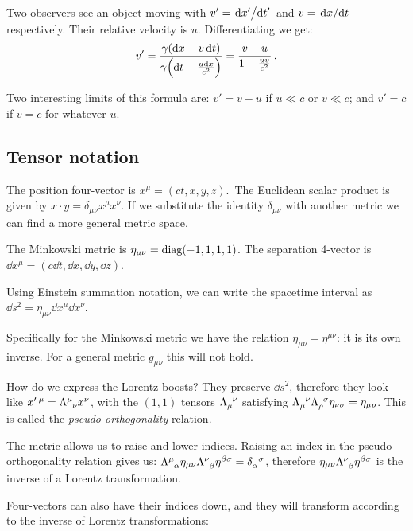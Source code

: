 \documentclass[main.tex]{subfiles}
\begin{document}
Two observers see an object moving with \(v' = \dv*{x'}{t'}\) and  \(v = \dv*{x}{t}\) respectively. Their relative velocity is \(u\).
Differentiating we get:
%
\begin{equation}
  v' = \frac{\gamma (\dd{x} - v \dd{t})}{\gamma \qty(\dd{t} - \frac{u\dd{x}}{c^2} )} = \frac{v - u}{1 - \frac{uv}{c^2}}  \,.
\end{equation}

Two interesting limits of this formula are: \(v' = v - u\) if \(u \ll c\) or \(v \ll c\); and \(v'=c\) if \(v=c\) for whatever \(u\).

\subsection{Tensor notation}

The position four-vector is \(x^\mu = (ct, x, y, z)\).\
The Euclidean scalar product is given by \(x \cdot y = \delta_{\mu\nu} x^\mu x^\nu \).
If we substitute the identity \(\delta_{\mu\nu}\) with another metric we can find a more general metric space.

The Minkowski metric is \(\eta_{\mu\nu} = \text{diag}\qty(-1, 1, 1, 1)\).
The separation 4-vector is \(\dd{x^\mu} = (c\dd{t}, \dd{x}, \dd{y}, \dd{z})\).

Using Einstein summation notation, we can write the spacetime interval as \(\dd{s^2} = \eta_{\mu\nu} \dd{x^\mu} \dd{x^\nu}\).

Specifically for the Minkowski metric we have the relation \(\eta_{\mu\nu} = \eta^{\mu\nu}\): it is its own inverse.
For a general metric \(g_{\mu\nu}\) this will not hold.

How do we express the Lorentz boosts? They preserve \(\dd{s^2} \), therefore they look like \(x'\,^\mu = \tensor{\Lambda}{^\mu_\nu} x^\nu\), with the \((1, 1)\) tensors \(\tensor{\Lambda}{_\mu^\nu}\)  satisfying   \(\tensor{\Lambda}{_\mu^\nu}\tensor{\Lambda}{_\rho^\sigma} \eta_{\nu\sigma} = \eta_{\mu\rho}\). This is called the \emph{pseudo-orthogonality} relation.

The metric allows us to raise and lower indices. Raising an index in the pseudo-orthogonality relation gives us: \(\tensor{\Lambda}{^\mu_\alpha} \eta_{\mu\nu} \tensor{\Lambda}{^\nu_\beta} \eta^{\beta\sigma} =\tensor{\delta}{_\alpha ^\sigma}\), therefore  \(\eta_{\mu\nu} \tensor{\Lambda}{^\nu_\beta} \eta^{\beta\sigma}\) is the inverse of a Lorentz transformation.

Four-vectors can also have their indices down, and they will transform according to the inverse of Lorentz transformations:
\end{document}
